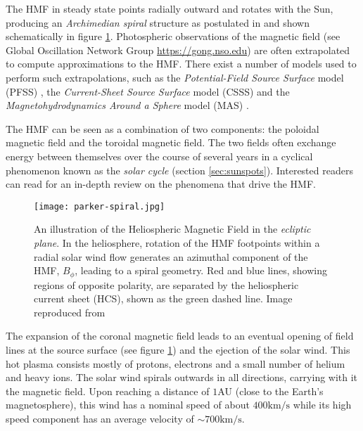 The HMF in steady state points radially outward and rotates with the Sun, producing an \emph{Archimedian spiral} 
structure as postulated in \cite{parker1958dynamics} and shown schematically in figure \ref{fig:parkerspiral}. 
Photospheric observations of the magnetic field (see Global Oscillation Network Group \url{https://gong.nso.edu}) 
are often extrapolated to compute approximations to the HMF. There exist a number of models used to perform such 
extrapolations, such as the \emph{Potential-Field Source Surface} model (PFSS) 
\citep{schatten1969model,altschuler1969magnetic}, the \emph{Current-Sheet Source Surface} model (CSSS) 
\citep{csss} and the \emph{Magnetohydrodynamics Around a Sphere} model (MAS) 
\citep{linker1999magnetohydrodynamic}. 

The HMF can be seen as a combination of two components: the poloidal magnetic field and the toroidal magnetic field.
The two fields often exchange energy between themselves over the course of several years in a cyclical phenomenon
known as the \emph{solar cycle} (section \ref{sec:sunspots}). Interested readers can read \citep{Owens2013} for an 
in-depth review on the phenomena that drive the HMF.

\begin{figure}
    \noindent\texttt{[image: parker-spiral.jpg]}
    \caption{\small{An illustration of the Heliospheric Magnetic Field in the \emph{ecliptic plane}. 
    In the heliosphere, rotation of the HMF footpoints within a radial solar wind flow generates an azimuthal 
    component of the HMF, $B_{\phi}$, leading to a spiral geometry. Red and blue lines, 
    showing regions of opposite polarity, are separated by the heliospheric current sheet (HCS), 
    shown as the green dashed line.
    Image reproduced from \citet{Owens2013}}}
    \label{fig:parkerspiral}
\end{figure}


The expansion of the coronal magnetic field leads to an eventual opening of field lines at the source surface 
(see figure \ref{fig:parkerspiral}) and the ejection of the solar wind. This hot plasma consists mostly of protons, 
electrons and a small number of helium and heavy ions. The solar wind spirals outwards in all directions, carrying 
with it the magnetic field. Upon reaching a distance of $1 \text{AU}$ (close to the Earth's magnetosphere), this wind 
has a nominal speed of about $400 \text{km}/\text{s}$ while its high speed component has an average velocity of 
$\sim 700 \text{km}/\text{s}$.

